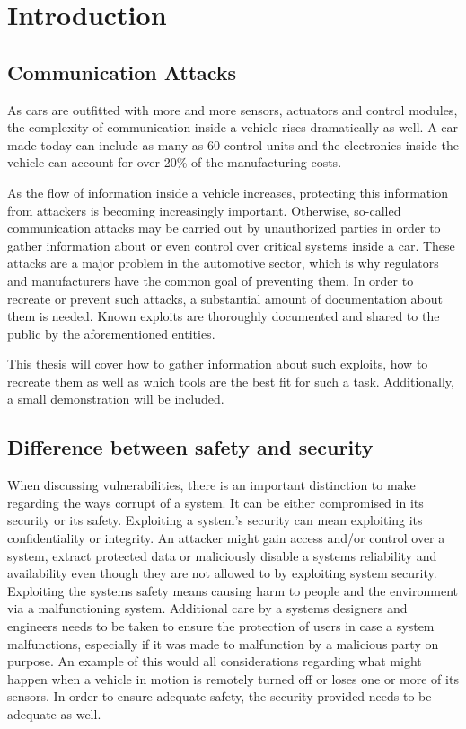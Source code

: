 \chapter{Introduction}

\section{Communication Attacks}
As cars are outfitted with more and more sensors, actuators and control modules, the complexity of communication inside a vehicle rises dramatically as well. A car made today can include as many as 60 control units and the electronics inside the vehicle can account for over 20\% of the manufacturing costs. 

As the flow of information inside a vehicle increases, protecting this information from attackers is becoming increasingly important. Otherwise, so-called communication attacks may be carried out by unauthorized parties in order to gather information about or even control over critical systems inside a car. These attacks are a major problem in the automotive sector, which is why regulators and manufacturers have the common goal of preventing them. In order to recreate or prevent such attacks, a substantial amount of documentation about them is needed. Known exploits are thoroughly documented and shared to the public by the aforementioned entities.

This thesis will cover how to gather information about such exploits, how to recreate them as well as which tools are the best fit for such a task. Additionally, a small demonstration will be included.

\section{Difference between safety and security}
When discussing vulnerabilities, there is an important distinction to make regarding the ways corrupt of a system. It can be either compromised in its security or its safety. 
Exploiting a system's security can mean exploiting its confidentiality or integrity. An attacker might gain access and/or control over a system, extract protected data or maliciously disable a systems reliability and availability even though they are not allowed to by exploiting system security.
Exploiting the systems safety means causing harm to people and the environment via a malfunctioning system. 
Additional care by a systems designers and engineers needs to be taken to ensure the protection of users in case a system malfunctions, especially if it was made to malfunction by a malicious party on purpose. 
An example of this would all considerations regarding what might happen when a vehicle in motion is remotely turned off or loses one or more of its sensors. In order to ensure adequate safety, the security provided needs to be adequate as well.

